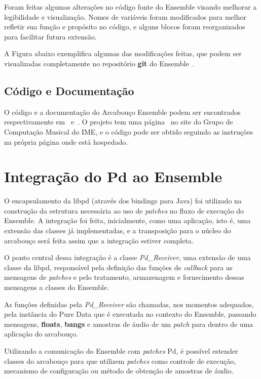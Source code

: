 \documentclass[a4paper, 11pt, twoside]{article}
\begin{document}
\begin{multicols}{2}
Foram feitas algumas alterações no código
fonte do Ensemble visando melhorar a legibilidade
e visualização. Nomes de variáveis foram modificados
para melhor refletir sua função e propósito no código, 
e alguns blocos foram reorganizados para facilitar
futura extensão.

A Figura abaixo exemplifica algumas das modificações feitas,
que podem ser visualizadas completamente no repositório
\textbf{git} do Ensemble~\cite{ensemble_git}.

\subsection{Código e Documentação}

O código e a documentação do Arcabouço Ensemble podem ser encontrados
respectivamente em~\cite{ensemblecode} e~\cite{ensembledoc}.
O projeto tem uma página~\cite{ensemblegrouppage} no site do Grupo de Computação 
Musical do IME, e o código pode ser obtido seguindo as instruções na própria página
onde está hospedado.

\section{Integração do Pd ao Ensemble}

O encapsulamento da libpd (através dos bindings para Java) foi utilizado na 
construção da estrutura necessária ao uso de \textit{patches} no fluxo de 
execução do Ensemble. A integração foi feita, inicialmente, como uma aplicação,
isto é, uma extensão das classes já implementadas, e a transposição para o 
núcleo do arcabouço será feita assim que a integração estiver completa.

O ponto central dessa integração é a classe \textit{Pd\_Receiver}, uma extensão
de uma classe da libpd, responsável pela definição das funções de 
\textit{callback} para as mensagens de \textit{patches} e pelo tratamento,
armazenagem e fornecimento dessas mensagens a classes do Ensemble.

As funções definidas pela \textit{Pd\_Receiver} são chamadas, nos momentos 
adequados, pela instância do Pure Data que é executada no contexto do Ensemble,
passando mensagens, \textbf{floats}, \textbf{bangs} e amostras de áudio
de um \textit{patch} para dentro de uma aplicação do arcabouço.

Utilizando a comunicação do Ensemble com \textit{patches} Pd, é possível
estender classes do arcabouço para que utilizem \textit{patches} como controle
de execução, mecanismo de configuração ou método de obtenção de amostras
de áudio.


\end{multicols}
\end{document}
